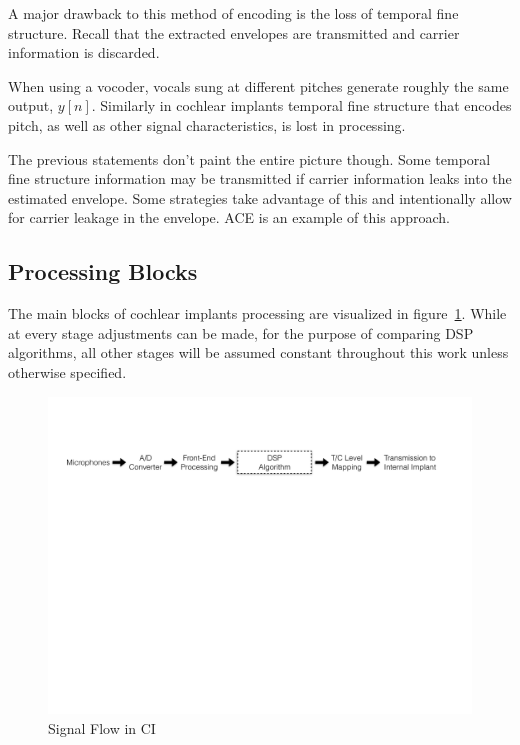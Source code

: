 \documentclass [11pt, proquest,oneside] {ganter_thesis}[2015/03/03]
\begin{document}
A major drawback to this method of encoding is the loss of temporal fine structure.  Recall that the extracted envelopes are transmitted and carrier information is discarded.

When using a vocoder, vocals sung at different pitches generate roughly the same output, $y[n]$.  Similarly in cochlear implants temporal fine structure that encodes pitch, as well as other signal characteristics, is lost in processing.

The previous statements don't paint the entire picture though.  Some temporal fine structure information may be transmitted if carrier information leaks into the estimated envelope.  Some strategies take advantage of this and intentionally allow for carrier leakage in the envelope.  ACE is an example of this approach.


\subsection{Processing Blocks}

The main blocks of cochlear implants processing are visualized in figure~\ref{fig:CI_signal_flow}.  While at every stage adjustments can be made, for the purpose of comparing DSP algorithms, all other stages will be assumed constant throughout this work unless otherwise specified.

\begin{figure}[!ht]
  \centering
    \includegraphics[width=1\textwidth]{CI_Signal_Flow}   
    \caption{Signal Flow in CI}\label{fig:CI_signal_flow}
\end{figure}
\end{document}
